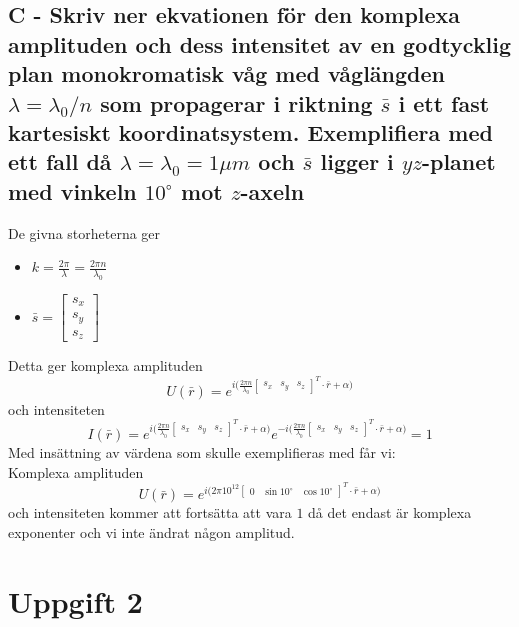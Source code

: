 \documentclass{article}
\begin{document}
  \subsection*{C - Skriv ner ekvationen för den komplexa amplituden och dess intensitet av en godtycklig plan monokromatisk våg med våglängden $\lambda=\lambda_0/n$ som propagerar i riktning $\bar{s}$ i ett fast kartesiskt koordinatsystem. Exemplifiera med ett fall då $\lambda=\lambda_0=1\mu m$ och $\bar{s}$ ligger i $yz$-planet med vinkeln $10^{\circ}$ mot $z$-axeln}
    De givna storheterna ger
    \begin{itemize}
      \item $k=\frac{2\pi}{\lambda}=\frac{2\pi n}{\lambda_0}$
      \item $\bar{s}=\begin{bmatrix}
        s_x\\
        s_y\\
        s_z
      \end{bmatrix}$
    \end{itemize}
    Detta ger komplexa amplituden
    \[
      U(\bar{r})=e^{i\big(\frac{2\pi n}{\lambda_0}\begin{bmatrix}
        s_x & s_y & s_z
      \end{bmatrix}^T\cdot\bar{r}+\alpha\big)}
    \]
    och intensiteten
    \[
      I(\bar{r})=e^{i\big(\frac{2\pi n}{\lambda_0}\begin{bmatrix}
        s_x & s_y & s_z
      \end{bmatrix}^T\cdot\bar{r}+\alpha\big)}e^{-i\big(\frac{2\pi n}{\lambda_0}\begin{bmatrix}
        s_x & s_y & s_z
      \end{bmatrix}^T\cdot\bar{r}+\alpha\big)}=1
    \]
    Med insättning av värdena som skulle exemplifieras med får vi:\\
    Komplexa amplituden
    \[
      U(\bar{r})=e^{i\big(2\pi 10^{12}\begin{bmatrix}
        0 & \sin{10^{\circ}} & \cos{10^{\circ}}
      \end{bmatrix}^T\cdot\bar{r}+\alpha\big)}
    \]
    och intensiteten kommer att fortsätta att vara $1$ då det endast är komplexa exponenter och vi inte ändrat någon amplitud.

\newpage
\section*{Uppgift 2}
\end{document}
